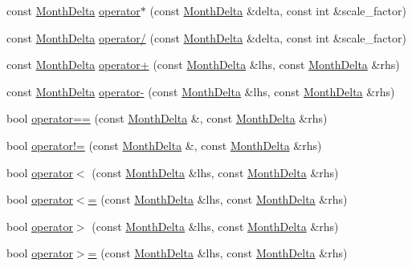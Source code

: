 \begin{DoxyCompactItemize}
\item 
const \hyperlink{structMonthDelta}{\-Month\-Delta} \hyperlink{structMonthDelta_a371fb6abbbaa0d2c2011d29af10171bc}{operator$\ast$} (const \hyperlink{structMonthDelta}{\-Month\-Delta} \&delta, const int \&scale\-\_\-factor)
\item 
const \hyperlink{structMonthDelta}{\-Month\-Delta} \hyperlink{structMonthDelta_abd091fddaf6d6459ff88179670c45dda}{operator/} (const \hyperlink{structMonthDelta}{\-Month\-Delta} \&delta, const int \&scale\-\_\-factor)
\item 
const \hyperlink{structMonthDelta}{\-Month\-Delta} \hyperlink{structMonthDelta_a9f7f420c48017d9fecdcebc1864fdcad}{operator+} (const \hyperlink{structMonthDelta}{\-Month\-Delta} \&lhs, const \hyperlink{structMonthDelta}{\-Month\-Delta} \&rhs)
\item 
const \hyperlink{structMonthDelta}{\-Month\-Delta} \hyperlink{structMonthDelta_aee1cce9ecf1c7d81fb306bf791cc22f1}{operator-\/} (const \hyperlink{structMonthDelta}{\-Month\-Delta} \&lhs, const \hyperlink{structMonthDelta}{\-Month\-Delta} \&rhs)
\item 
bool \hyperlink{structMonthDelta_a9edf8fc83e1d85f6973698f907671f2d}{operator==} (const \hyperlink{structMonthDelta}{\-Month\-Delta} \&, const \hyperlink{structMonthDelta}{\-Month\-Delta} \&rhs)
\item 
bool \hyperlink{structMonthDelta_a4af85af4ca025c7850dc65b9ec909c67}{operator!=} (const \hyperlink{structMonthDelta}{\-Month\-Delta} \&, const \hyperlink{structMonthDelta}{\-Month\-Delta} \&rhs)
\item 
bool \hyperlink{structMonthDelta_a6f3a37e7ae7d150527288eb9bca5ba32}{operator$<$} (const \hyperlink{structMonthDelta}{\-Month\-Delta} \&lhs, const \hyperlink{structMonthDelta}{\-Month\-Delta} \&rhs)
\item 
bool \hyperlink{structMonthDelta_a4e21f655714fb7458c802657db98a92e}{operator$<$=} (const \hyperlink{structMonthDelta}{\-Month\-Delta} \&lhs, const \hyperlink{structMonthDelta}{\-Month\-Delta} \&rhs)
\item 
bool \hyperlink{structMonthDelta_a6cf5a665207c6f9817bf88d2f717971f}{operator$>$} (const \hyperlink{structMonthDelta}{\-Month\-Delta} \&lhs, const \hyperlink{structMonthDelta}{\-Month\-Delta} \&rhs)
\item 
bool \hyperlink{structMonthDelta_a4b5b7c83455bf5d2ed3422d2a9960f59}{operator$>$=} (const \hyperlink{structMonthDelta}{\-Month\-Delta} \&lhs, const \hyperlink{structMonthDelta}{\-Month\-Delta} \&rhs)
\end{DoxyCompactItemize}



